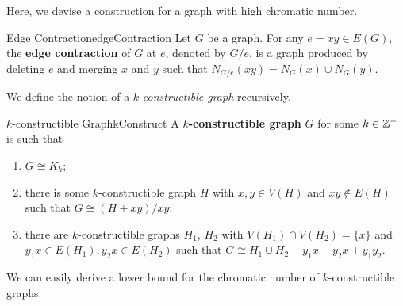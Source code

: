 \documentclass[math, code]{amznotes}
\theoremstyle{remark}
\begin{document}
Here, we devise a construction for a graph with high chromatic number.
\begin{dfnbox}{Edge Contraction}{edgeContraction}
    Let $G$ be a graph. For any $e = xy \in E(G)$, the {\color{red} \textbf{edge contraction}} of $G$ at $e$, denoted by $G/e$, is a graph produced by deleting $e$ and merging $x$ and $y$ such that $N_{G/e}(xy) = N_G(x) \cup N_G(y)$.
\end{dfnbox}
We define the notion of a $k$-\textit{constructible graph} recursively.
\begin{dfnbox}{$k$-constructible Graph}{kConstruct}
    A {\color{red} \textbf{$k$-constructible graph}} $G$ for some $k \in \mathbb{Z}^+$ is such that 
    \begin{enumerate}
        \item $G \cong K_k$;
        \item there is some $k$-constructible graph $H$ with $x, y \in V(H)$ and $xy \notin E(H)$ such that $G \cong (H + xy)/xy$;
        \item there are $k$-constructible graphs $H_1$, $H_2$ with $V(H_1) \cap V(H_2) = \{x\}$ and $y_1x \in E(H_1), y_2x \in E(H_2)$ such that $G \cong H_1 \cup H_2 - y_1x - y_2x + y_1y_2$.
    \end{enumerate}
\end{dfnbox}
We can easily derive a lower bound for the chromatic number of $k$-constructible graphs.
\end{document}
